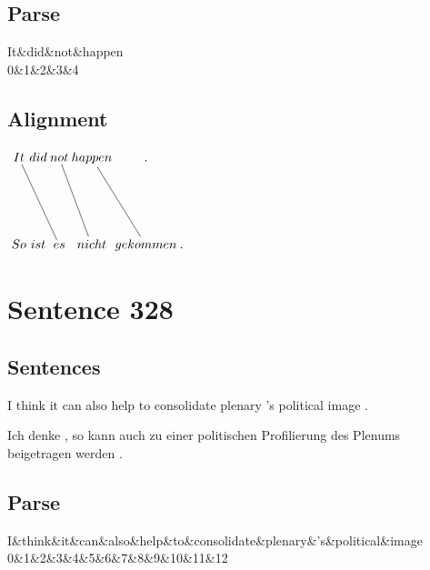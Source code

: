 \documentclass{report}
\begin{document}
\subsection*{Parse}
\begin{dependency}[theme=simple]
\begin{deptext}[column sep=.5cm, row sep=.1ex]
It\&did\&not\&happen\\
0\&1\&2\&3\&4\\
\end{deptext}
\end{dependency}


\subsection*{Alignment}
\scriptsize{
$
\xymatrix@C-2.3pc{
It \ar @{-} [ddrr] & did & not \ar @{-} [ddr] & happen \ar @{-} [ddr] & .\\\\
So & ist & es & nicht & gekommen & .
}$}
\newpage\section*{Sentence 328}

\subsection*{Sentences}
I think it can also help to consolidate plenary 's political image .

\noindent Ich denke , so kann auch zu einer politischen Profilierung des Plenums beigetragen werden .



\subsection*{Parse}
\begin{dependency}[theme=simple]
\begin{deptext}[column sep=.5cm, row sep=.1ex]
I\&think\&it\&can\&also\&help\&to\&consolidate\&plenary\&'s\&political\&image\\
0\&1\&2\&3\&4\&5\&6\&7\&8\&9\&10\&11\&12\\
\end{deptext}
\end{dependency}
\end{document}
